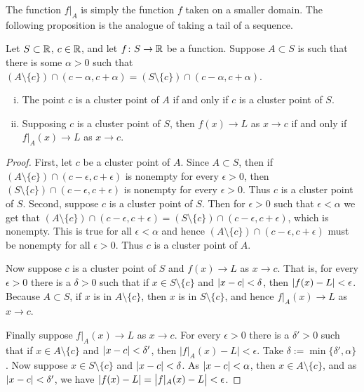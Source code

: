 The function $f|_A$ is simply the function $f$ taken on a smaller domain.
The following proposition is the analogue of taking a tail of a sequence.

\begin{prop} \label{prop:limrest}
Let $S \subset {\mathbb{R}}$, $c \in {\mathbb{R}}$, and
let $f \colon S
\to {\mathbb{R}}$ be a function.
Suppose
$A \subset S$ is such that there is some $\alpha > 0$ such that
$(A \setminus \{ c \}) \cap (c-\alpha,c+\alpha) = (S \setminus \{ c \}) \cap (c-\alpha,c+\alpha)$.
\begin{enumerate}[(i)]
\item The point $c$ is a cluster point of $A$ if and only if $c$ is a cluster point
of $S$.
\item Supposing $c$ is a cluster point of $S$, then $f(x) \to L$ as $x \to c$ if and only if
$f|_A(x) \to L$ as $x \to c$.
\end{enumerate}
\end{prop}

\begin{proof}
First, let $c$ be a cluster point of $A$.
Since $A \subset S$, then if $( A \setminus \{ c\} ) \cap
(c-\epsilon,c+\epsilon)$ is nonempty for every $\epsilon > 0$,
then $( S \setminus \{ c\} ) \cap
(c-\epsilon,c+\epsilon)$ is nonempty for every $\epsilon > 0$.
Thus $c$ is a cluster point of $S$.
Second, suppose $c$ is a cluster
point of $S$.  Then for $\epsilon > 0$ such that $\epsilon < \alpha$
we get that $( A \setminus \{ c\} ) \cap (c-\epsilon,c+\epsilon) =
( S \setminus \{ c\} ) \cap (c-\epsilon,c+\epsilon)$, which is nonempty.  This is true for all
$\epsilon < \alpha$ and hence 
$( A \setminus \{ c\} ) \cap (c-\epsilon,c+\epsilon)$ must be nonempty for all
$\epsilon > 0$.  Thus $c$ is a cluster point of $A$.

Now suppose $c$ is a cluster point of $S$ and $f(x) \to L$ as $x \to c$.  That is, for every $\epsilon > 0$
there is a $\delta > 0$ such that if $x \in S \setminus \{ c \}$
and $\left\lvert {x-c} \right\rvert < \delta$, then $\left\lvert {f(x)-L} \right\rvert < \epsilon$.  Because $A \subset S$,
if $x$ is in $A \setminus \{ c \}$, then $x$ is in $S \setminus \{ c
\}$, and hence $f|_A(x) \to L$ as $x \to c$.

Finally suppose $f|_A(x) \to L$ as $x \to c$.
For every $\epsilon > 0$
there is a $\delta' > 0$ such that if $x \in A \setminus \{ c \}$
and $\left\lvert {x-c} \right\rvert < \delta'$, then $\bigl\lvert f|_A(x)-L \bigr\rvert < \epsilon$.
Take $\delta := \min \{ \delta', \alpha \}$.
Now suppose $x \in S \setminus \{ c \}$ and
$\left\lvert {x-c} \right\rvert < \delta$.  As $\left\lvert {x-c} \right\rvert < \alpha$, then $x \in A \setminus \{ c \}$,
and as $\left\lvert {x-c} \right\rvert < \delta'$, 
we have $\left\lvert {f(x)-L} \right\rvert = \bigl\lvert f|_A(x)-L
\bigr\rvert < \epsilon$.
\end{proof}

